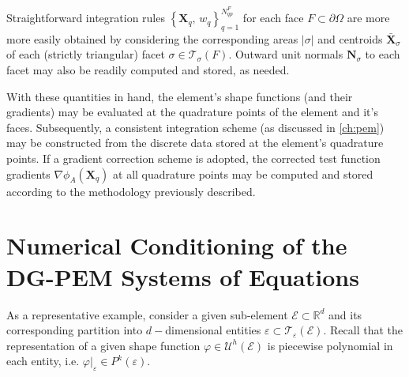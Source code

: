 	Straightforward integration rules $\left\{ \mathbf{X}_q, \, w_q \right\}_{q=1}^{N^F_{qp}}$ for each face $F \subset \partial \Omega$ are more more easily obtained by considering the corresponding areas $|\sigma|$ and centroids $\bar{\mathbf{X}}_\sigma$ of each (strictly triangular) facet $\sigma \in \mathcal{T}_{\sigma} (F)$. Outward unit normals $\mathbf{N}_\sigma$ to each facet may also be readily computed and stored, as needed.

	With these quantities in hand, the element's shape functions (and their gradients) may be evaluated at the quadrature points of the element and it's faces. Subsequently, a consistent integration scheme (as discussed in \ref{ch:pem}) may be constructed from the discrete data stored at the element's quadrature points. If a gradient correction scheme is adopted, the corrected test function gradients $\nabla \phi_A (\mathbf{X}_q)$ at all quadrature points may be computed and stored according to the methodology previously described.

\section{Numerical Conditioning of the \\ DG-PEM Systems of Equations}

As a representative example, consider a given sub-element $\mathcal{E} \subset \mathbb{R}^d$ and its corresponding partition into $d-$dimensional entities $\varepsilon \subset \mathcal{T}_\varepsilon (\mathcal{E})$. Recall that the representation of a given shape function $\varphi \in \mathcal{U}^h (\mathcal{E})$ is piecewise polynomial in each entity, i.e. $\varphi|_{\varepsilon} \in P^k (\varepsilon)$.

